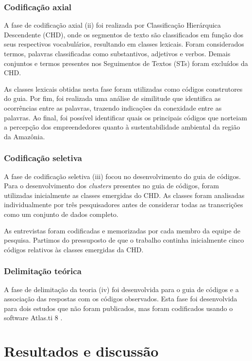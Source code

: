 \subsubsection*{Codificação axial}

A fase de codificação axial (ii) foi realizada por Classificação Hierárquica Descendente (CHD), onde os segmentos de texto são classificados em função dos seus respectivos vocabulários, resultando em classes lexicais. Foram considerados termos, palavras classificadas como substantivos, adjetivos e verbos. Demais conjuntos e termos presentes nos Seguimentos de Textos (STs) foram excluídos da CHD. 

As classes lexicais obtidas nesta fase foram utilizadas como códigos construtores do guia. Por fim, foi realizada uma análise de similitude que identifica as ocorrências entre as palavras, trazendo indicações da conexidade entre as palavras. Ao final, foi possível identificar quais os principais códigos que norteiam a percepção dos empreendedores quanto à sustentabilidade ambiental da região da Amazônia.

\subsubsection*{Codificação seletiva}

A fase de codificação seletiva (iii) focou no desenvolvimento do guia de códigos. Para o desenvolvimento dos \textit{clusters} presentes no guia de códigos, foram utilizadas inicialmente as classes emergidas do CHD. As classes foram analisadas individualmente por três pesquisadores antes de considerar todas as transcrições como um conjunto de dados completo. 

As entrevistas foram codificadas e memorizadas por cada membro da equipe de pesquisa. Partimos do pressuposto de que o trabalho continha inicialmente cinco códigos relativos às classes emergidas da CHD. 


\subsubsection{Delimitação teórica}

A fase de delimitação da teoria (iv) foi desenvolvida para o guia de códigos e a associação das respostas com os códigos observados. Esta fase foi desenvolvida para dois estudos que não foram publicados, mas foram codificados usando o software Atlas.ti 8 \cite{Paulus2019ItMethod}.

\section{Resultados e discussão}

